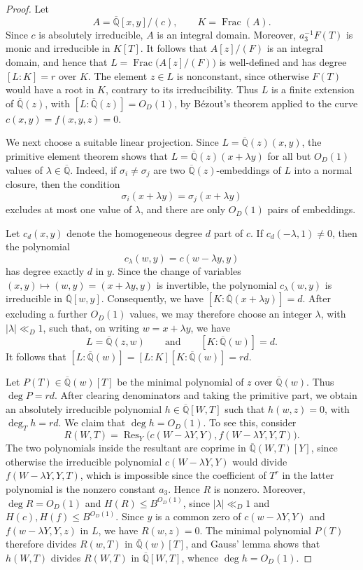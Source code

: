 \documentclass[a4paper,11pt,twoside,reqno]{amsart}
\theoremstyle{definition}
\theoremstyle{remark}
\numberwithin{equation}{section}
\newcommand\K{\overline{\mathbb{Q}}}
\newcommand\1{\mathbf{1}}
\DeclareMathOperator\Res{Res}
\renewcommand{\leq}{\leqslant}
\begin{document}
\begin{proof}
Let 
\[
A=\K[x,y]/(c),\qquad K=\operatorname{Frac}(A).
\]
Since $c$ is absolutely irreducible, $A$ is an integral domain. Moreover,
$a_3^{-1}F(T)$ is monic and irreducible in $K[T]$. It follows that
$A[z]/(F)$ is an integral domain, and hence that
$L=\operatorname{Frac}\bigl(A[z]/(F)\bigr)$
is well-defined and has degree
$[L:K]=r$ over $K$.
The element $z\in L$ is nonconstant, since otherwise $F(T)$ would have
a root in $K$, contrary to its irreducibility. Thus $L$ is a finite
extension of $\K(z)$, with 
$[L:\K(z)]=O_D(1)$,
by B\'ezout's theorem applied to the curve
$c(x,y)=f(x,y,z)=0$.

We next choose a suitable linear projection. Since
$L=\K(z)(x,y)$, the primitive element theorem shows that
$L=\K(z)(x+\lambda y)$
for all but $O_D(1)$ values of $\lambda\in\K$. Indeed, if
$\sigma_i\neq\sigma_j$ are two $\K(z)$-embeddings of $L$ into a
normal closure, then the condition
\[
\sigma_i(x+\lambda y)=\sigma_j(x+\lambda y)
\]
excludes at most one value of $\lambda$, and there are only $O_D(1)$
pairs of embeddings.

Let $c_d(x,y)$ denote the homogeneous degree $d$ part of $c$.
If
$c_d(-\lambda,1)\neq0$,
then the polynomial
\[
c_\lambda(w,y)=c(w-\lambda y,y)
\]
has degree exactly $d$ in $y$. Since the change of variables
$(x,y)\mapsto(w,y)=(x+\lambda y,y)$ is invertible, the polynomial
$c_\lambda(w,y)$ is irreducible in $\K[w,y]$. Consequently,
we have $[K:\K(x+\lambda y)]=d$.
After excluding a further $O_D(1)$ values, we may therefore choose
an integer $\lambda$, with $|\lambda|\ll_D1$, such that, on writing
$w=x+\lambda y$,
we have
\[
L=\K(z,w)
\qquad\text{and}\qquad
[K:\K(w)]=d.
\]
It follows that
$
[L:\K(w)]
=
[L:K][K:\K(w)]
=
rd $.

Let $P(T)\in\K(w)[T]$ be the minimal polynomial of $z$ over
$\K(w)$. Thus $\deg P=rd$. After clearing denominators and taking
the primitive part, we obtain an absolutely irreducible polynomial
$h\in\K[W,T]$
such that
$h(w,z)=0$, with $\deg_T h=rd$.
We claim that $\deg h=O_D(1)$. To see this, consider
\[
R(W,T)
=
\Res_Y\bigl(
c(W-\lambda Y,Y),
f(W-\lambda Y,Y,T)
\bigr).
\]
The two polynomials inside the resultant are coprime in
$\K(W,T)[Y]$, since otherwise the irreducible polynomial
$c(W-\lambda Y,Y)$ would divide
$f(W-\lambda Y,Y,T)$, which is impossible since the coefficient
of $T^r$ in the latter polynomial is the nonzero constant $a_3$.
Hence $R$ is nonzero. Moreover,
$\deg R=O_D(1)$ and $H(R)\leq B^{O_D(1)}$, since $|\lambda|\ll_D1$ and $H(c),H(f)\leq B^{O_D(1)}$.
Since $y$ is a common zero of
$c(w-\lambda Y,Y)$ and $f(w-\lambda Y,Y,z)$
in $L$, we have $R(w,z)=0$. The minimal polynomial $P(T)$ therefore
divides $R(w,T)$ in $\K(w)[T]$, and Gauss' lemma shows that
$h(W,T)$ divides $R(W,T)$ in $\K[W,T]$, whence 
$\deg h=O_D(1)$.



\end{proof}
\end{document}
